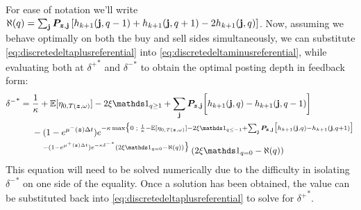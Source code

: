 For ease of notation we'll write $\aleph(q) = \sum_{\mathbf{j}} \bm{P}_{\bm{z},\mathbf{j}} \left[ h_{k+1}(\mathbf{j}, q-1) + h_{k+1}(\mathbf{j}, q+1) -2 h_{k+1}(\mathbf{j}, q)  \right]$. Now, assuming we behave optimally on both the buy and sell sides simultaneously, we can substitute \autoref{eq:discretedeltaplusreferential} into \autoref{eq:discretedeltaminusreferential}, while evaluating both at ${\delta^+}^*$ and ${\delta^-}^*$ to obtain the optimal posting depth in feedback form:
\begin{equation}\label{eq:discretedeltaminusfeedback}
\begin{split}
{\delta^-}^* & = \frac{1}{\kappa} + \E[\eta_{0,T(\bz, \omega)}] - 2 \xi \indicator_{q \geq 1} + \sum_\bj \bP_{\bz,\bj} \biggl[ h_{k+1}(\bj, q) - h_{k+1}(\bj, q-1) \biggr] \\
& \hphantom{{}={}} - (1-e^{\mu^-(\bz) \Delta t})e^{-\kappa \max \bigl\lbrace 0 \; ; \; \frac{1}{\kappa} - \E[\eta_{0,T(\bz, \omega)}] - 2 \xi \indicator_{q \leq -1} + \sum_\bj \bP_{\bz,\bj} \bigl[ h_{k+1}(\bj, q) - h_{k+1}(\bj, q+1) \bigr]} \\
& \hphantom{{}={} {}-{}} {}^{-(1-e^{\mu^+ (\bz) \Delta t})e^{-\kappa {\delta^-}^*} \left( 2 \xi \indicator_{q = 0} - \aleph(q) \right) \bigr\rbrace } \left( 2 \xi \indicator_{q = 0} - \aleph(q) \right)
\end{split}
\end{equation}
This equation will need to be solved numerically due to the difficulty in isolating ${\delta^{-}}^*$ on one side of the equality. Once a solution has been obtained, the value can be substituted back into \eqref{eq:discretedeltaplusreferential} to solve for ${\delta^{+}}^*$.

